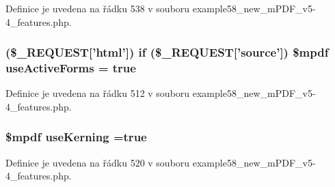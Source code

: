 Definice je uvedena na řádku 538 v souboru example58\-\_\-new\-\_\-m\-P\-D\-F\-\_\-v5-\/4\-\_\-features.\-php.

\hypertarget{example58__new__m_p_d_f__v5-4__features_8php_a378161bd0fa26b3dc46a75ac7aa2671b}{
\subsubsection[{use\-Active\-Forms}]{ (\$\-\_\-\-R\-E\-Q\-U\-E\-S\-T\mbox{[}'html'\mbox{]}) {\bf if} (\$\-\_\-\-R\-E\-Q\-U\-E\-S\-T\mbox{[}'source'\mbox{]}) \$mpdf use\-Active\-Forms = true}}\label{example58__new__m_p_d_f__v5-4__features_8php_a378161bd0fa26b3dc46a75ac7aa2671b}


Definice je uvedena na řádku 512 v souboru example58\-\_\-new\-\_\-m\-P\-D\-F\-\_\-v5-\/4\-\_\-features.\-php.

\hypertarget{example58__new__m_p_d_f__v5-4__features_8php_aee7b0f8606c1b4849e0166a4a335069d}{
\subsubsection[{use\-Kerning}]{\setlength{\rightskip}{0pt plus 5cm}\$mpdf use\-Kerning =true}}\label{example58__new__m_p_d_f__v5-4__features_8php_aee7b0f8606c1b4849e0166a4a335069d}


Definice je uvedena na řádku 520 v souboru example58\-\_\-new\-\_\-m\-P\-D\-F\-\_\-v5-\/4\-\_\-features.\-php.

